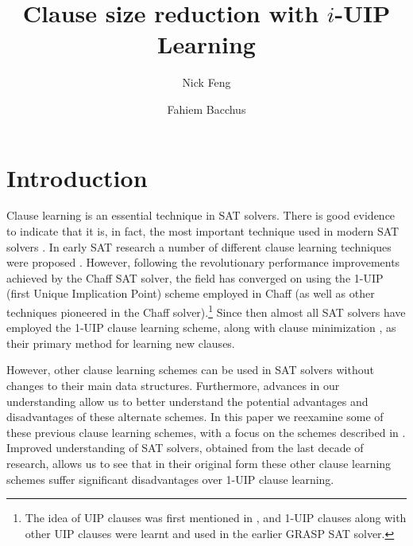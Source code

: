 \documentclass[runningheads]{llncs}
\title{Clause size reduction with $i$-UIP Learning}
\author{Nick Feng \and Fahiem Bacchus}
\institute{Department of Computer Science, University of Toronto, Canada, 
  \email{\{nfeng,fbacchus\}@cs.toronto.edu}}
\newcommand{\sat}{SAT\xspace}
\begin{document}
\maketitle              %
% 
\begin{abstract}
\end{abstract}

\section{Introduction}
Clause learning is an essential technique in \sat solvers. There is good
evidence to indicate that it is, in fact, the most important technique
used in modern \sat solvers \cite{DBLP:conf/sat/KatebiSS11}. In early
\sat research a number of different clause learning techniques were
proposed
\cite{DBLP:conf/iccad/ZhangMMM01,DBLP:conf/iccad/SilvaS96,DBLP:journals/tc/Marques-SilvaS99,DBLP:conf/aaai/BayardoS97}.
However, following the revolutionary performance improvements achieved
by the Chaff \sat solver, the field has converged on using the 1-UIP
(first Unique Implication Point) scheme
\cite{DBLP:conf/iccad/ZhangMMM01} employed in Chaff
\cite{DBLP:conf/dac/MoskewiczMZZM01} (as well as other techniques
pioneered in the Chaff solver).\footnote{The idea of UIP clauses was
  first mentioned in \cite{DBLP:journals/tc/Marques-SilvaS99}, and
  1-UIP clauses along with other UIP clauses were learnt and used in
  the earlier GRASP \sat solver.} Since then almost all \sat solvers
have employed the 1-UIP clause learning scheme, along with clause
minimization \cite{DBLP:conf/sat/SorenssonB09}, as their primary
method for learning new clauses.

However, other clause learning schemes can be used in SAT solvers
without changes to their main data structures. Furthermore, advances
in our understanding allow us to better understand the potential
advantages and disadvantages of these alternate schemes. In this paper
we reexamine some of these previous clause learning schemes, with a
focus on the schemes described in
\cite{DBLP:conf/iccad/ZhangMMM01}. Improved understanding of \sat
solvers, obtained from the last decade of research, allows us to see
that in their original form these other clause learning schemes suffer
significant disadvantages over 1-UIP clause learning.
\end{document}
